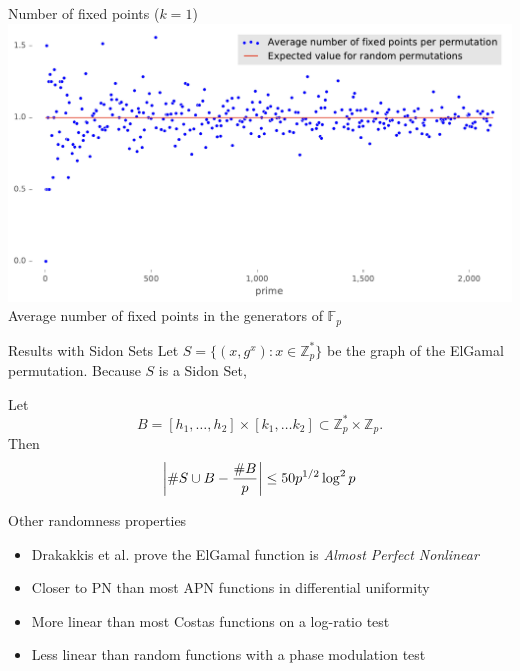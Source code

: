 \begin{frame}{Number of fixed points ($k=1$)}
        \centering
        \includegraphics[width=\textwidth]{figures/average_number_of_fixed_points_per_permutation}\\
{Average number of fixed points in the generators of $\mathbb{F}_p$}
\end{frame}


\begin{frame}{Results with Sidon Sets}
  Let $S = \{(x,g^x): x \in \mathbb{Z}_p^*\}$ be the graph of the ElGamal permutation. Because $S$ is a Sidon Set,

  \begin{theorem}[Niehues et al., 2020]
    Let
    \[
      B = [h_1,\ldots, h_2] \times [k_1,\ldots k_2] \subset \mathbb{Z}_p^* \times \mathbb{Z}_p.
    \]
    Then
    \[
      \left | \#{S \cup B} - \frac{\#{B}}{p} \right | \leq 50 p^{1/2} \log^2 p
\]
    \end{theorem}
\end{frame}

\begin{frame}{Other randomness properties}

  \begin{itemize}
  \item Drakakkis et al. prove the ElGamal function is {\em Almost Perfect Nonlinear}
    \item Closer to PN than most APN functions in differential uniformity
    \item More linear than most Costas functions on a log-ratio test
      \item Less linear than random functions with a phase modulation test 
    \end{itemize}
  
  \end{frame}



